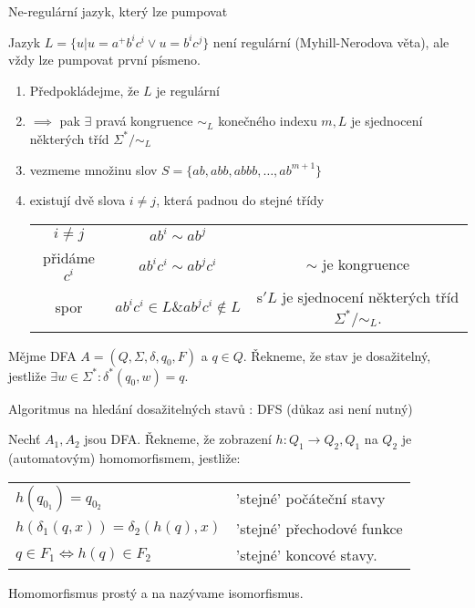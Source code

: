 \documentclass[../main.tex]{subfiles}
\begin{document}
\begin{example}
    Ne-regulární jazyk, který lze pumpovat

    Jazyk $L=\{u|u = a^+b^ic^i\vee u = b^ic^j\}$ není regulární (Myhill-Nerodova věta), ale 
    vždy lze pumpovat první písmeno.
    \begin{enumerate}
        \item Předpokládejme, že $L$ je regulární
        \item $\implies$ pak $\exists$ pravá kongruence $\sim_L$ konečného indexu $m, L$ je sjednocení
        některých tříd $\Sigma^*/\sim_L$
        \item vezmeme množinu slov $S = \{ab,abb,abbb,\dots,ab^{m+1}\}$
        \item existují dvě slova $i \neq j$, která padnou do stejné třídy\\
        \begin{tabular}{c c c}
            $i \neq j$ & $ab^i \sim ab^j$ & \\
            přidáme $c^i$ & $ab^ic^i \sim ab^jc^i$ & $\sim$ je kongruence \\
            spor & $ab^ic^i \in L \& ab^jc^i \notin L$ & s$'L$ je sjednocení některých tříd $\Sigma^*/\sim_L$. 
        \end{tabular}
    \end{enumerate}
\end{example}

\begin{definition}
    Mějme DFA $A = (Q,\Sigma,\delta,q_0,F)$ a $q\in Q$. Řekneme, že stav je dosažitelný,
    jestliže $\exists w \in \Sigma^* : \delta^*(q_0,w) = q$.
\end{definition}
\begin{example}
    Algoritmus na hledání dosažitelných stavů : DFS (důkaz asi není nutný)
\end{example}

\begin{definition}
    Nechť $A_1,A_2$ jsou DFA. Řekneme, že zobrazení $h: Q_1 \rightarrow Q_2, Q_1$ na $Q_2$ je 
    (automatovým) homomorfismem, jestliže:
    \begin{center}
        \begin{tabular}{l l}
            $h(q_{0_1})=q_{0_2}$ & 'stejné' počáteční stavy \\
            $h(\delta_1(q,x)) = \delta_2(h(q),x)$ & 'stejné' přechodové funkce \\
            $q \in F_1 \Leftrightarrow h(q) \in F_2$ & 'stejné' koncové stavy. \\
        \end{tabular}
    \end{center}
    Homomorfismus prostý a na nazývame isomorfismus.
\end{definition}
\end{document}
